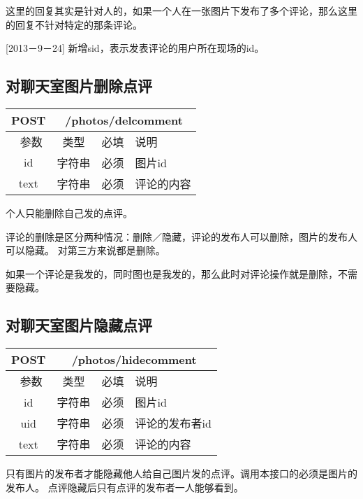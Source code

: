 这里的回复其实是针对人的，如果一个人在一张图片下发布了多个评论，那么这里的回复不针对特定的那条评论。

[2013－9－24] 新增sid，表示发表评论的用户所在现场的id。


\subsection{对聊天室图片删除点评}

\begin{table}[H]
   \begin{center}
\begin{tabular}{|c|c|c|p{12cm}|}
\hline
POST & \multicolumn{3}{|c|}{/photos/delcomment} \\
\hline\hline
 \  参数  & 类型 & 必填 &  说明  \\
  \hline
 id  & 字符串 & 必须 & 图片id\\
  \hline
 text  & 字符串 & 必须 & 评论的内容\\
\hline
\end{tabular}
   \end{center}
\end{table}
个人只能删除自己发的点评。

评论的删除是区分两种情况：删除／隐藏，评论的发布人可以删除，图片的发布人可以隐藏。
对第三方来说都是删除。

如果一个评论是我发的，同时图也是我发的，那么此时对评论操作就是删除，不需要隐藏。


\subsection{对聊天室图片隐藏点评}

\begin{table}[H]
   \begin{center}
\begin{tabular}{|c|c|c|p{12cm}|}
\hline
POST & \multicolumn{3}{|c|}{/photos/hidecomment} \\
\hline\hline
 \  参数  & 类型 & 必填 &  说明  \\
  \hline
 id  & 字符串 & 必须 & 图片id\\
  \hline
 uid  & 字符串 & 必须 & 评论的发布者id\\
   \hline
 text  & 字符串 & 必须 & 评论的内容\\
\hline
\end{tabular}
   \end{center}
\end{table}
只有图片的发布者才能隐藏他人给自己图片发的点评。调用本接口的必须是图片的发布人。
点评隐藏后只有点评的发布者一人能够看到。


